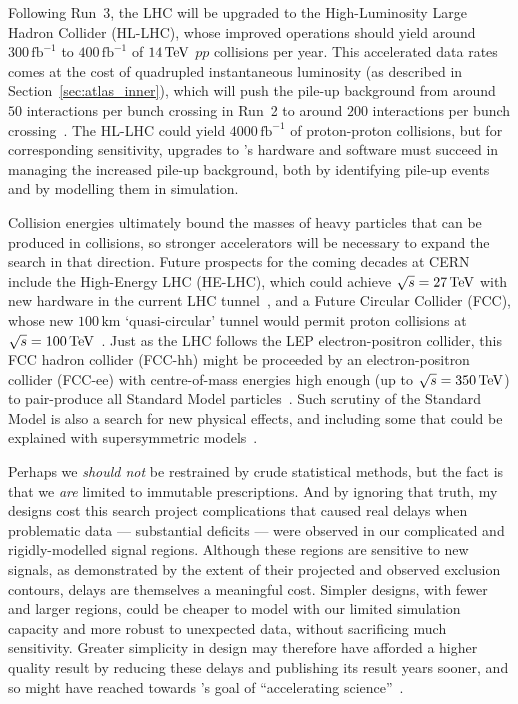 Following Run~3, the LHC will be upgraded to the
High-Luminosity Large Hadron Collider (HL-LHC), whose improved operations
should yield around $300\,\mathrm{fb}^{-1}$ to $400\,\mathrm{fb}^{-1}$ of
$14\,\eV[T]$ $pp$ collisions per year.
This accelerated data rates comes at the cost of quadrupled instantaneous
luminosity (as described in Section~\ref{sec:atlas_inner}), which will push
the pile-up background from around $50$ interactions per bunch crossing in
Run~2 to around $200$ interactions per bunch crossing~\cite{
ATLAS:2022hro,
ZurbanoFernandez:2020cco
}.
The HL-LHC could yield $4000\,\mathrm{fb}^{-1}$ of proton-proton collisions,
but for corresponding sensitivity, upgrades to \atlas's hardware and software
must succeed in managing the increased pile-up background, both by
identifying pile-up events and by modelling them in simulation.

Collision energies ultimately bound the masses of heavy particles that can
be produced in collisions, so stronger accelerators will be necessary
to expand the search in that direction.
Future prospects for the coming decades at CERN include the
High-Energy LHC (HE-LHC), which could achieve $\sqrt{s}=27\,\eV[T]$ with new
hardware in the current LHC tunnel~\cite{FCC:2018byv},
and a Future Circular Collider (FCC), whose new $100\,\mathrm{km}$
`quasi-circular' tunnel would permit proton collisions at
$\sqrt{s}=100\,\eV[T]$~\cite{FCC:2018vvp}.
Just as the LHC follows the LEP electron-positron collider, this FCC hadron
collider (FCC-hh) might be proceeded by an electron-positron collider (FCC-ee)
with centre-of-mass energies high enough (up to $\sqrt{s}=350\,\eV[T]$) to
pair-produce all Standard Model particles~\cite{FCC:2018evy}.
Such scrutiny of the Standard Model is also a search for new physical effects,
and including some that could be explained with supersymmetric
models~\cite{FCC:2018byv, Gounaris1999}.

Perhaps we \emph{should not} be restrained by crude statistical
methods, but the fact is that we \emph{are} limited to immutable prescriptions.
And by ignoring that truth, my designs cost this search project complications
that caused real delays when problematic data
--- substantial deficits ---
were observed in our complicated and rigidly-modelled signal regions.
Although these regions are sensitive to new signals, as demonstrated by the
extent of their projected and observed exclusion contours, delays are
themselves a meaningful cost.
Simpler designs, with fewer and larger regions, could be cheaper to model with
our limited simulation capacity and more robust to unexpected data, without
sacrificing much sensitivity.
Greater simplicity in design may therefore have afforded a higher quality
result by reducing these delays and publishing its result years sooner,
and so might have reached towards \cern's goal of
``accelerating science''~\cite{Radford:1551933}.

